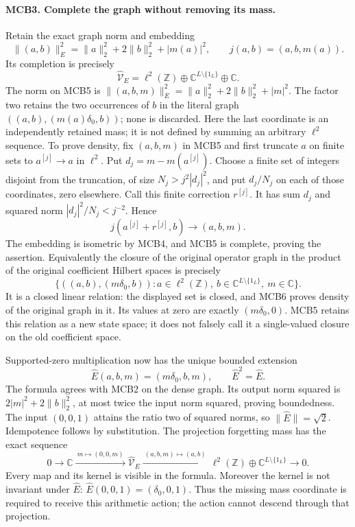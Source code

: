 \paragraph{MCB3. Complete the graph without removing its mass.}
Retain the exact graph norm and embedding
\[
 \|(a,b)\|_E^2=\|a\|_2^2+2\|b\|_2^2+|m(a)|^2,
 \qquad j(a,b)=(a,b,m(a)).                        \tag{MCB4}
\]
Its completion is precisely
\[
 \widehat{\mathcal V}_E=
 \ell^2(\mathbb Z)\oplus\mathbb C^{L\setminus\{1_L\}}
                              \oplus\mathbb C.    \tag{MCB5}
\]
The norm on MCB5 is
\(\|(a,b,m)\|_E^2=\|a\|_2^2+2\|b\|_2^2+|m|^2\).
The factor two retains the two occurrences of \(b\) in the
literal graph \(((a,b),(m(a)\delta_0,b))\); none is discarded.
Here the last coordinate is an independently retained mass; it
is not defined by summing an arbitrary \(\ell^2\) sequence.
To prove density, fix \((a,b,m)\) in MCB5 and first truncate
\(a\) on finite sets to \(a^{[j]}\to a\) in \(\ell^2\).
Put \(d_j=m-m(a^{[j]})\). Choose a finite set of integers
disjoint from the truncation, of size \(N_j>j^2|d_j|^2\),
and put \(d_j/N_j\) on each of those coordinates, zero elsewhere.
Call this finite correction \(r^{[j]}\). It has sum \(d_j\)
and squared norm \(|d_j|^2/N_j<j^{-2}\). Hence
\[
 j(a^{[j]}+r^{[j]},b)\longrightarrow(a,b,m).
                                                               \tag{MCB6}
\]
The embedding is isometric by MCB4, and MCB5 is complete,
proving the assertion.
Equivalently the closure of the original operator graph in the
product of the original coefficient Hilbert spaces is precisely
\[
 \{((a,b),(m\delta_0,b)):a\in\ell^2(\mathbb Z),\ b\in
       \mathbb C^{L\setminus\{1_L\}},\ m\in\mathbb C\}.
                                                               \tag{MCB20}
\]
It is a closed linear relation: the displayed set is closed,
and MCB6 proves density of the original graph in it. Its values
at zero are exactly \((m\delta_0,0)\). MCB5 retains this
relation as a new state space; it does not falsely call it a
single-valued closure on the old coefficient space.

Supported-zero multiplication now has the unique bounded extension
\[
 \widehat E(a,b,m)=(m\delta_0,b,m),\qquad
 \widehat E^2=\widehat E .                         \tag{MCB7}
\]
The formula agrees with MCB2 on the dense graph. Its output norm
squared is \(2|m|^2+2\|b\|_2^2\), at most twice the input norm
squared, proving boundedness. The input \((0,0,1)\) attains
the ratio two of squared norms, so \(\|\widehat E\|=\sqrt2\).
Idempotence follows by substitution.
The projection forgetting mass has the exact sequence
\[
 0\longrightarrow\mathbb C
 \xrightarrow{\ m\mapsto(0,0,m)\ }
 \widehat{\mathcal V}_E
 \xrightarrow{\ (a,b,m)\mapsto(a,b)\ }
 \ell^2(\mathbb Z)\oplus\mathbb C^{L\setminus\{1_L\}}
 \longrightarrow0 .                              \tag{MCB8}
\]
Every map and its kernel is visible in the formula. Moreover the
kernel is not invariant under \(\widehat E\):
\(\widehat E(0,0,1)=(\delta_0,0,1)\).
Thus the missing mass coordinate is required to receive this
arithmetic action; the action cannot descend through that projection.

